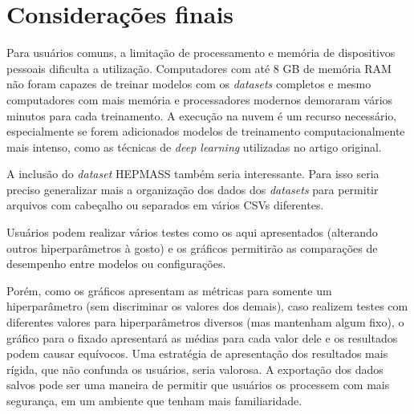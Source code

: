 \documentclass[12pt]{article}
\begin{document}
\section{Considerações finais}

Para usuários comuns, a limitação de processamento e memória de dispositivos pessoais dificulta a utilização. 
Computadores com até 8 GB de memória RAM não foram capazes de treinar modelos com os \textit{datasets} completos e mesmo computadores com mais memória e processadores modernos demoraram vários minutos para cada treinamento.
A execução na nuvem é um recurso necessário, especialmente se forem adicionados modelos de treinamento computacionalmente mais intenso, como as técnicas de \textit{deep learning} utilizadas no artigo original.

A inclusão do \textit{dataset} HEPMASS \cite{hepmass_347} também seria interessante. 
Para isso seria preciso generalizar mais a organização dos dados dos \textit{datasets} para permitir arquivos com cabeçalho ou separados em vários CSVs diferentes.

Usuários podem realizar vários testes como os aqui apresentados (alterando outros hiperparâmetros à gosto) e os gráficos permitirão as comparações de desempenho entre modelos ou configurações.

Porém, como os gráficos apresentam as métricas para somente um hiperparâmetro (sem discriminar os valores dos demais), caso realizem testes com diferentes valores para hiperparâmetros diversos (mas mantenham algum fixo), o gráfico para o fixado apresentará as médias para cada valor dele e os resultados podem causar equívocos.
Uma estratégia de apresentação dos resultados mais rígida, que não confunda os usuários, seria valorosa.
A exportação dos dados salvos pode ser uma maneira de permitir que usuários os processem com mais segurança, em um ambiente que tenham mais familiaridade.

\vfill



\end{document}
